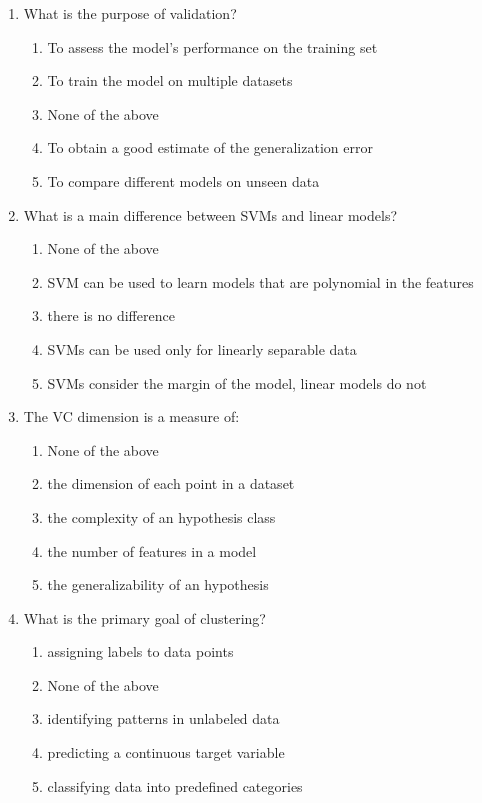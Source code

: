 \documentclass[a4paper,11pt,oneside]{book}
\begin{document}
\begin{enumerate}
    \clearpage
    \item What is the purpose of validation?
    \begin{enumerate}[label=\alph*)]
        \item To assess the model's performance on the training set
        \item To train the model on multiple datasets
        \item None of the above
        \item To obtain a good estimate of the generalization error
        \item To compare different models on unseen data
    \end{enumerate}

    \item What is a main difference between SVMs and linear models?
    \begin{enumerate}[label=\alph*)]
        \item None of the above
        \item SVM can be used to learn models that are polynomial in the features
        \item there is no difference
        \item SVMs can be used only for linearly separable data
        \item SVMs consider the margin of the model, linear models do not
    \end{enumerate}

    \item The VC dimension is a measure of:
    \begin{enumerate}[label=\alph*)]
        \item None of the above
        \item the dimension of each point in a dataset
        \item the complexity of an hypothesis class
        \item the number of features in a model
        \item the generalizability of an hypothesis
    \end{enumerate}

    \item What is the primary goal of clustering?
    \begin{enumerate}[label=\alph*)]
        \item assigning labels to data points
        \item None of the above
        \item identifying patterns in unlabeled data
        \item predicting a continuous target variable
        \item classifying data into predefined categories
    \end{enumerate}


\end{enumerate}
\end{document}
